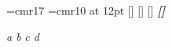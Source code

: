 \documentclass{article}
\begin{document}
\font\x=cmr17 \font\y=cmr10 at 12pt
[\the{}\x] [\the{}\y] \textsc{[\the{}\font]} \textbf{\textit{[\the{}\font]}}
{\fontsize{11}{13}}

{\itshape a {\em b}} {\slshape c {\em d}}
\end{document}
